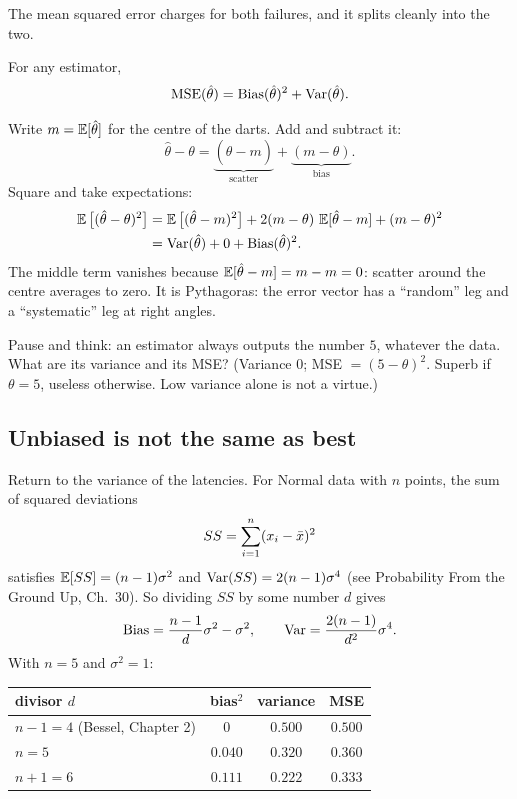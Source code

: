The mean squared error charges for both failures, and it splits cleanly into the two.

\begin{theorem}
For any estimator,
\[
  \operatorname{MSE}(\hat\theta) = \operatorname{Bias}(\hat\theta)^2 + \operatorname{Var}(\hat\theta) .
\]
\end{theorem}

\begin{whybox}
Write $m = \operatorname{\mathbb{E}}[\hat\theta]$ for the centre of the darts. Add and subtract it:
\[
  \hat\theta - \theta = \underbrace{(\hat\theta - m)}_{\text{scatter}}
  + \underbrace{(m - \theta)}_{\text{bias}} .
\]
Square and take expectations:
\begin{align*}
  \operatorname{\mathbb{E}}\big[(\hat\theta-\theta)^2\big] &= \operatorname{\mathbb{E}}\big[(\hat\theta-m)^2\big] + 2(m-\theta)\,\operatorname{\mathbb{E}}[\hat\theta-m] + (m-\theta)^2 \\
  &= \operatorname{Var}(\hat\theta) + 0 + \operatorname{Bias}(\hat\theta)^2 .
\end{align*}
The middle term vanishes because $\operatorname{\mathbb{E}}[\hat\theta - m] = m - m = 0$: scatter around the
centre averages to zero. It is Pythagoras: the error vector has a ``random'' leg and a ``systematic''
leg at right angles.
\end{whybox}

\begin{recoverybox}
Pause and think: an estimator always outputs the number $5$, whatever the data. What
are its variance and its MSE? (Variance $0$; MSE $=(5-\theta)^2$. Superb if
$\theta=5$, useless otherwise. Low variance alone is not a virtue.)
\end{recoverybox}

\subsection{Unbiased is not the same as best}

Return to the variance of the latencies. For Normal data with $n$ points, the sum of squared deviations
\[
  SS = \sum_{i=1}^n (x_i-\bar{x})^2
\]
satisfies $\operatorname{\mathbb{E}}[SS]=(n-1)\sigma^2$ and $\operatorname{Var}(SS) = 2(n-1)\sigma^4$ (see Probability From the Ground Up, Ch.~30). So dividing
$SS$ by some number $d$ gives
\[
  \operatorname{Bias} = \frac{n-1}{d}\sigma^2 - \sigma^2, \qquad
  \operatorname{Var} = \frac{2(n-1)}{d^2}\sigma^4 .
\]
With $n=5$ and $\sigma^2=1$:

\begin{center}
\begin{tabular}{lccc}
\toprule
divisor $d$ & bias$^2$ & variance & MSE \\
\midrule
$n-1=4$ (Bessel, Chapter 2) & $0$ & $0.500$ & $0.500$ \\
$n=5$ & $0.040$ & $0.320$ & $0.360$ \\
$n+1=6$ & $0.111$ & $0.222$ & $0.333$ \\
\bottomrule
\end{tabular}
\end{center}

